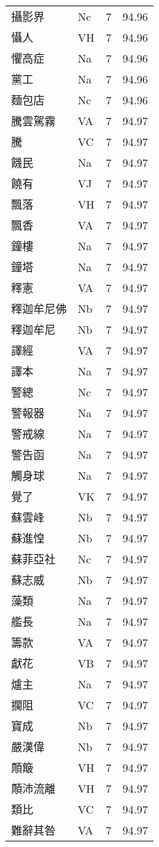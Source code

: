 \documentclass[twocolumn]{book}
\begin{document}
\begin{supertabular}{llrr}
攝影界 & Nc & 7 &  94.96\\
懾人 & VH & 7 &  94.96\\
懼高症 & Na & 7 &  94.96\\
黨工 & Na & 7 &  94.96\\
麵包店 & Nc & 7 &  94.96\\
騰雲駕霧 & VA & 7 &  94.97\\
騰 & VC & 7 &  94.97\\
饑民 & Na & 7 &  94.97\\
饒有 & VJ & 7 &  94.97\\
飄落 & VH & 7 &  94.97\\
飄香 & VA & 7 &  94.97\\
鐘樓 & Na & 7 &  94.97\\
鐘塔 & Na & 7 &  94.97\\
釋憲 & VA & 7 &  94.97\\
釋迦牟尼佛 & Nb & 7 &  94.97\\
釋迦牟尼 & Nb & 7 &  94.97\\
譯經 & VA & 7 &  94.97\\
譯本 & Na & 7 &  94.97\\
警總 & Nc & 7 &  94.97\\
警報器 & Na & 7 &  94.97\\
警戒線 & Na & 7 &  94.97\\
警告函 & Na & 7 &  94.97\\
觸身球 & Na & 7 &  94.97\\
覺了 & VK & 7 &  94.97\\
蘇雲峰 & Nb & 7 &  94.97\\
蘇進惶 & Nb & 7 &  94.97\\
蘇菲亞社 & Nc & 7 &  94.97\\
蘇志威 & Nb & 7 &  94.97\\
藻類 & Na & 7 &  94.97\\
艦長 & Na & 7 &  94.97\\
籌款 & VA & 7 &  94.97\\
獻花 & VB & 7 &  94.97\\
爐主 & Na & 7 &  94.97\\
攔阻 & VC & 7 &  94.97\\
寶成 & Nb & 7 &  94.97\\
嚴漢偉 & Nb & 7 &  94.97\\
顛簸 & VH & 7 &  94.97\\
顛沛流離 & VH & 7 &  94.97\\
類比 & VC & 7 &  94.97\\
難辭其咎 & VA & 7 &  94.97\\

\end{supertabular}
\end{document}
